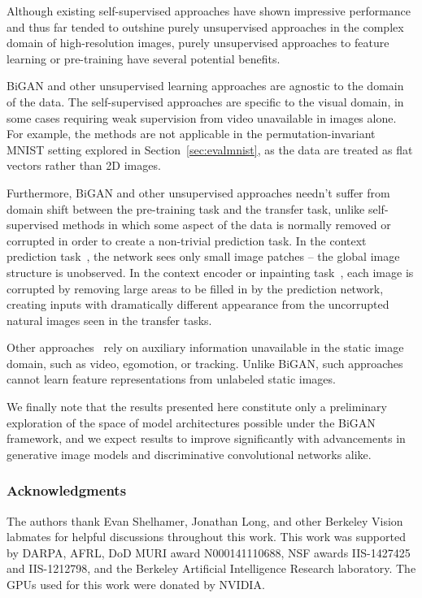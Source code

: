 \documentclass{article}
\begin{document}
Although existing self-supervised approaches have shown impressive performance and thus far tended to outshine purely unsupervised approaches
in the complex domain of high-resolution images,
purely unsupervised approaches to feature learning or pre-training have several potential benefits.

BiGAN and other unsupervised learning approaches are agnostic to the domain of the data.
The self-supervised approaches are specific to the visual domain,
in some cases requiring weak supervision from video unavailable in images alone.
For example, the methods are not applicable in the permutation-invariant MNIST setting explored in Section~\ref{sec:evalmnist},
as the data are treated as flat vectors rather than 2D images.

Furthermore, BiGAN and other unsupervised approaches needn't suffer from domain shift between the pre-training task and the transfer task,
unlike self-supervised methods in which some aspect of the data is normally removed or corrupted in order to create a non-trivial prediction task.
In the context prediction task~\citep{carl}, the network sees only small image patches --
the global image structure is unobserved.
In the context encoder or inpainting task~\citep{deepak},
each image is corrupted by removing large areas to be filled in by the prediction network,
creating inputs with dramatically different appearance
from the uncorrupted natural images seen in the transfer tasks.

Other approaches~\citep{pulkit,xiaolong} rely on auxiliary information
unavailable in the static image domain,
such as video, egomotion, or tracking.
Unlike BiGAN, such approaches cannot learn feature representations from unlabeled static images.

We finally note that the results presented here constitute only a preliminary exploration of the space of model architectures possible under the BiGAN framework,
and we expect results to improve significantly with advancements in generative image models and discriminative convolutional networks alike.


\subsubsection*{Acknowledgments}
The authors thank Evan Shelhamer, Jonathan Long, and other Berkeley Vision labmates for helpful discussions throughout this work.
This work was supported by DARPA, AFRL, DoD MURI award N000141110688, NSF awards IIS-1427425 and IIS-1212798, and the Berkeley Artificial Intelligence Research laboratory.
The GPUs used for this work were donated by NVIDIA.
\end{document}

